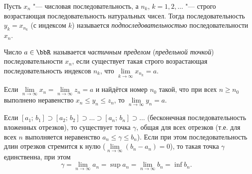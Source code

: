 
\begin{defn} \label{df2:13}
Пусть $x_n$ "--- числовая последовательность, а $n_k$, $k = 1, 2, \ldots$ "--- строго возрастающая последовательность натуральных чисел. Тогда последовательность $y_k = x_{n_k}$ (с индексом $k$) называется \textit{подпоследовательностью} последовательности $x_n$.
\end{defn}


\begin{defn} \label{df2:14}
Число $a \in \bbR$ называется \textit{частичным пределом} (\textit{предельной точкой}) последовательности $x_n$, если существует такая строго возрастающая последовательность индексов $n_k$, что $\lim\limits_{k \to \infty} x_{n_k} = a$.
\end{defn}


\begin{thm} \label{th2:3}
Если $\lim\limits_{n \to \infty} x_n = \lim\limits_{n \to \infty} z_n = a$ и найдётся номер $n_0$ такой, что при всех $n \ge n_0$ выполнено неравенство $x_n \le y_n \le z_n$, то $\lim\limits_{n \to \infty} y_n = a$.
\end{thm}


\begin{thm} \label{th2:5}
Если $[a_1;\, b_1] \supset [a_2;\, b_2] \supset \ldots \supset [a_n;\, b_n] \supset \ldots$ (бесконечная последовательность вложенных отрезков), то существует точка $\gamma$, общая для всех отрезков (т.е. для всех $n$ выполняется неравенство $a_n \le \gamma \le b_n$). Если при этом последовательность длин отрезков стремится к нулю ($\lim\limits_{n \to \infty} (b_n - a_n) = 0$), то такая точка $\gamma$ единственна, при этом
$$
\gamma = \lim_{n \to \infty} a_n = \sup a_n = \lim_{n \to \infty} b_n = \inf b_n.
$$
\end{thm}

